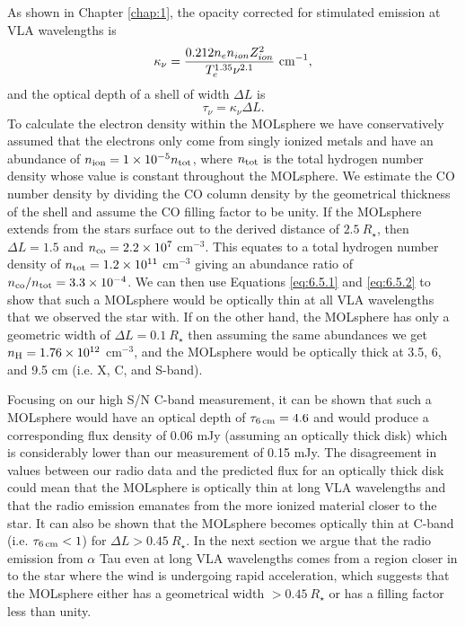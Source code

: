 As shown in Chapter \ref{chap:1}, the opacity corrected for stimulated emission at VLA wavelengths is
\begin{equation}
\kappa _{\nu} =\frac{0.212n_{e}n_{ion}Z_{ion}^2}{T_{e}^{1.35}\nu ^{2.1}} \ \rm{cm}^{-1},
\label{eq:6.5.1}
\end{equation}
and the optical depth of a shell of width $\Delta L$ is
\begin{equation}
\tau _{\nu} =\kappa _{\nu}\Delta L.
\label{eq:6.5.2}
\end{equation}
To calculate the electron density within the MOLsphere we have conservatively assumed that the electrons only come from singly ionized metals and have an abundance of $n_{\rm{ion}}=1\times 10^{-5} n_{\rm{tot}}$, where $n_{\rm{tot}}$ is the total hydrogen number density whose value is constant throughout the MOLsphere. We estimate the CO number density by dividing the CO column density by the geometrical thickness of the shell and assume the CO filling factor to be unity. If the MOLsphere extends from the stars surface out to the derived distance of $2.5 \ R_{\star}$, then $\Delta L = 1.5$ and $n_{\rm{co}} = 2.2 \times 10^{7} $ cm$^{-3}$. This equates to a total hydrogen number density of $n_{\rm{tot}}=1.2 \times 10^{11}$ cm$^{-3}$ \citep{ohnaka_2013} giving an abundance ratio of $n_{\rm{co}}/n_{\rm{tot}} = 3.3\times 10^{-4}$. We can then use Equations \ref{eq:6.5.1} and \ref{eq:6.5.2} to show that such a MOLsphere would be optically thin at all VLA wavelengths that we observed the star with. If on the other hand, the MOLsphere has only a geometric width of $\Delta L = 0.1 \ R_{\star}$ then assuming the same abundances we get $n_{\rm{H}}=1.76\times 10^{12}$ cm$^{-3}$, and the MOLsphere would be optically thick at 3.5, 6, and 9.5 cm (i.e. X, C, and S-band). 

Focusing on our high S/N C-band measurement, it can be shown that such a MOLsphere would have an optical depth of $\tau _{\rm{6\,cm}} = 4.6$ and would produce a corresponding flux density of  0.06 mJy (assuming an optically thick disk) which is considerably lower than our measurement of 0.15 mJy. The disagreement in values between our radio data and the predicted flux for an optically thick disk could mean that the MOLsphere is optically thin at long VLA wavelengths and that the radio emission emanates from the more ionized material closer to the star. It can also be shown that the MOLsphere becomes optically thin at C-band (i.e. $\tau _{\rm{6\,cm}} < 1$) for $\Delta L > 0.45 \ R_{\star}$. In the next section we argue that the radio emission from $\alpha$ Tau even at long VLA wavelengths comes from a region closer in to the star where the wind is undergoing rapid acceleration, which suggests that the MOLsphere either has a geometrical width  $> 0.45 \ R _{\star}$ or has a filling factor less than unity.

